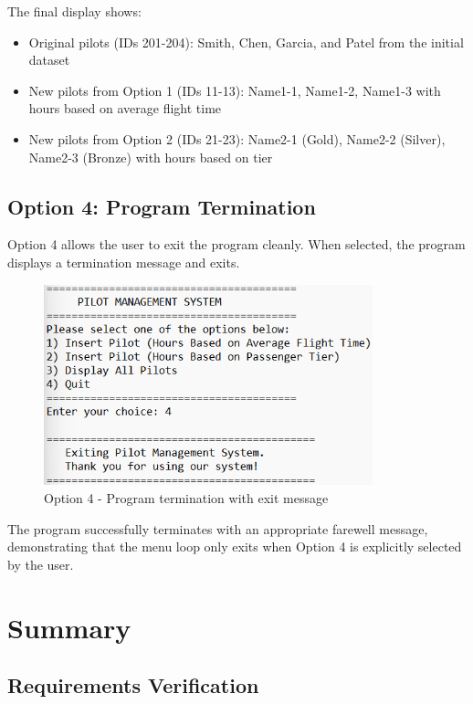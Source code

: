 \documentclass[12pt]{article}
\begin{document}
The final display shows:
\begin{itemize}
    \item Original pilots (IDs 201-204): Smith, Chen, Garcia, and Patel from the initial dataset
    \item New pilots from Option 1 (IDs 11-13): Name1-1, Name1-2, Name1-3 with hours based on average flight time
    \item New pilots from Option 2 (IDs 21-23): Name2-1 (Gold), Name2-2 (Silver), Name2-3 (Bronze) with hours based on tier
\end{itemize}

\newpage
\subsection{Option 4: Program Termination}

Option 4 allows the user to exit the program cleanly. When selected, the program displays a termination message and exits.

\begin{figure}[h]
\centering
\includegraphics[width=0.85\textwidth]{../../../Screenshots/Problem1/Other/Option4.png}
\caption{Option 4 - Program termination with exit message}
\label{fig:option4}
\end{figure}

The program successfully terminates with an appropriate farewell message, demonstrating that the menu loop only exits when Option 4 is explicitly selected by the user.

\newpage
\section{Summary}

\subsection{Requirements Verification}
\end{document}
